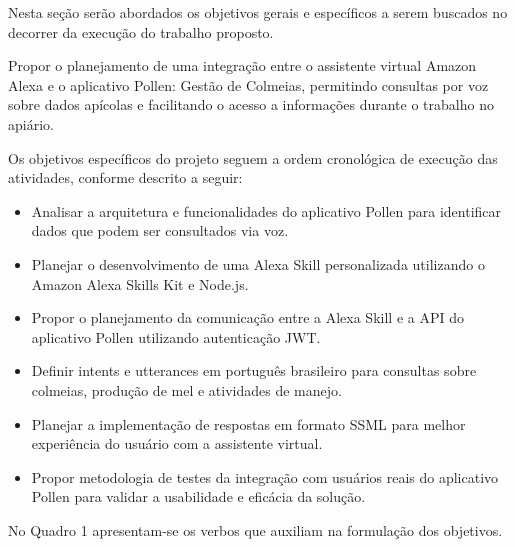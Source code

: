 \label{sec:objetivos}
Nesta seção serão abordados os objetivos gerais e específicos a serem buscados no decorrer da execução do trabalho proposto.

\label{ssec:objetivo-geral}

Propor o planejamento de uma integração entre o assistente virtual Amazon Alexa e o aplicativo Pollen: Gestão de Colmeias, permitindo consultas por voz sobre dados apícolas e facilitando o acesso a informações durante o trabalho no apiário.

\label{ssec:objetivos-especificos}

Os objetivos específicos do projeto seguem a ordem cronológica de execução das atividades, conforme descrito a seguir:

\begin{itemize}
    \item Analisar a arquitetura e funcionalidades do aplicativo Pollen para identificar dados que podem ser consultados via voz.
    
    \item Planejar o desenvolvimento de uma Alexa Skill personalizada utilizando o Amazon Alexa Skills Kit e Node.js.

    \item Propor o planejamento da comunicação entre a Alexa Skill e a API do aplicativo Pollen utilizando autenticação JWT.

    \item Definir intents e utterances em português brasileiro para consultas sobre colmeias, produção de mel e atividades de manejo.

    \item Planejar a implementação de respostas em formato SSML para melhor experiência do usuário com a assistente virtual.

    \item Propor metodologia de testes da integração com usuários reais do aplicativo Pollen para validar a usabilidade e eficácia da solução.
\end{itemize}

No Quadro 1 apresentam-se os verbos que auxiliam na formulação dos objetivos.

